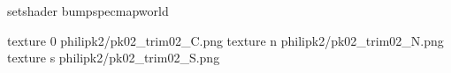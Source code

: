 setshader bumpspecmapworld

texture 0 philipk2/pk02_trim02_C.png
texture n philipk2/pk02_trim02_N.png
texture s philipk2/pk02_trim02_S.png


